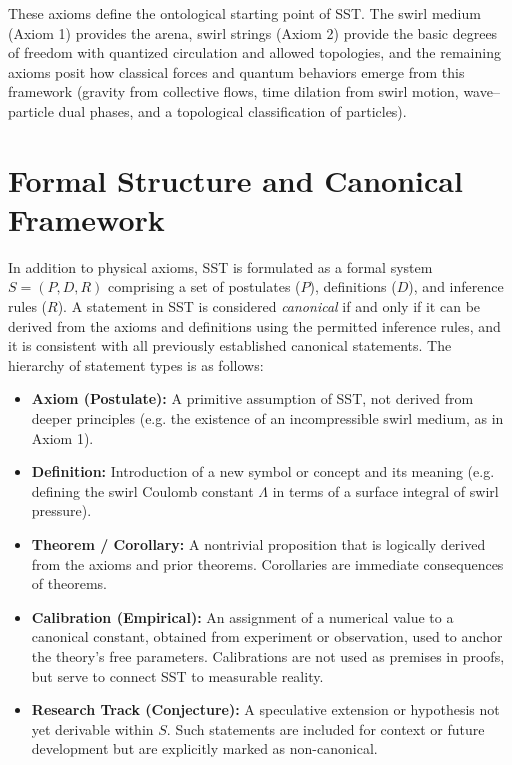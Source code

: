 \documentclass[10pt,reprint,aps,onecolumn,nofootinbib]{revtex4-2}
\begin{document}
	These axioms define the ontological starting point of SST. The swirl medium (Axiom 1) provides the arena, swirl strings (Axiom 2) provide the basic degrees of freedom with quantized circulation and allowed topologies, and the remaining axioms posit how classical forces and quantum behaviors emerge from this framework (gravity from collective flows, time dilation from swirl motion, wave–particle dual phases, and a topological classification of particles).


	\section{Formal Structure and Canonical Framework}
	In addition to physical axioms, SST is formulated as a formal system $S = (P, D, R)$ comprising a set of postulates ($P$), definitions ($D$), and inference rules ($R$). A statement in SST is considered \emph{canonical} if and only if it can be derived from the axioms and definitions using the permitted inference rules, and it is consistent with all previously established canonical statements. The hierarchy of statement types is as follows:

	\begin{itemize}
	    \item \textbf{Axiom (Postulate):} A primitive assumption of SST, not derived from deeper principles (e.g. the existence of an incompressible swirl medium, as in Axiom 1).
	    \item \textbf{Definition:} Introduction of a new symbol or concept and its meaning (e.g. defining the swirl Coulomb constant $\Lambda$ in terms of a surface integral of swirl pressure).
	    \item \textbf{Theorem / Corollary:} A nontrivial proposition that is logically derived from the axioms and prior theorems. Corollaries are immediate consequences of theorems.
	    \item \textbf{Calibration (Empirical):} An assignment of a numerical value to a canonical constant, obtained from experiment or observation, used to anchor the theory’s free parameters. Calibrations are not used as premises in proofs, but serve to connect SST to measurable reality.
	    \item \textbf{Research Track (Conjecture):} A speculative extension or hypothesis not yet derivable within $S$. Such statements are included for context or future development but are explicitly marked as non-canonical.
	\end{itemize}
\end{document}
